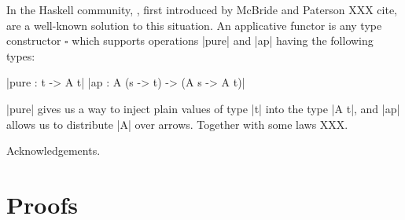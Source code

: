 \documentclass[sigplan,screen]{acmart}
\begin{document}
In the Haskell community, , first
introduced by McBride and Paterson XXX cite, are a well-known
solution to this situation.  An applicative functor is any type
constructor $\square$ which supports operations |pure| and |ap| having
the following types:

|pure : t -> A t|
|ap : A (s -> t) -> (A s -> A t)|

|pure| gives us a way to inject plain values of type |t| into the type
|A t|, and |ap| allows us to distribute |A| over arrows.  Together
with some laws XXX.






\begin{acks}
Acknowledgements.
\end{acks}




\appendix

\section{Proofs}
\end{document}

